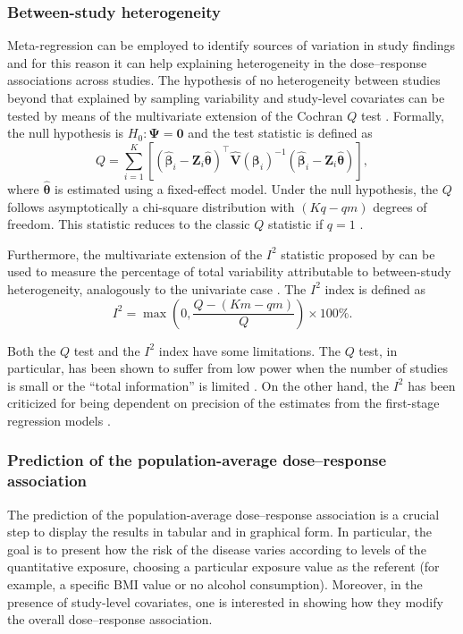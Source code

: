 \subsubsection{Between-study heterogeneity}
Meta-regression can be employed to identify sources of variation in study findings and for this reason it can help explaining heterogeneity in the dose--response associations across studies. The hypothesis of no heterogeneity between studies beyond that explained by sampling variability and study-level covariates can be tested by means of the multivariate extension of the Cochran $Q$ test \citep{ritz_multivariate_2008, jackson_quantifying_2012}. Formally, the null hypothesis is $H_0: \boldsymbol{\Psi} = \mathbf{0}$ and the test statistic is defined as
\begin{equation}
	Q= \sum_{i=1}^K \left[\left(\hat{\boldsymbol{\beta}}_i - \mathbf{Z}_i \hat{\boldsymbol{\theta}} \right)^\top  \hat{\mathbf{V}}(\boldsymbol{\beta}_i)^{-1} \left(\hat{\boldsymbol{\beta}}_i - \mathbf{Z}_i \hat{\boldsymbol{\theta}} \right) \right],
	\label{eq:multiq}
\end{equation}
where $\hat{\boldsymbol{\theta}}$ is estimated using a fixed-effect model. Under the null hypothesis, the $Q$ follows asymptotically a chi-square distribution with $(Kq-qm)$ degrees of freedom. This statistic reduces to the classic $Q$ statistic if $q=1$ \citep{cochran_combination_1954}.

Furthermore, the multivariate extension of the $I^2$ statistic proposed by \citet{jackson_quantifying_2012} can be used to measure the percentage of total variability attributable to between-study heterogeneity, analogously to the univariate case \citep{higgins_quantifying_2002}. The $I^2$ index is defined as
\begin{equation}
I^2 = \max\left(0, \frac{Q - (Km - qm)}{Q}\right)\times 100\%.
\label{eq:multii2}
\end{equation}


Both the $Q$ test and the $I^2$ index have some limitations. The $Q$ test, in particular, has been shown to suffer from low power when the number of studies is small or the ``total information'' is limited \citep{hardy_detecting_1998}. On the other hand, the $I^2$ has been criticized for being dependent on precision of the estimates from the first-stage regression models \citep{rucker_undue_2008}.

\subsubsection{Prediction of the population-average dose--response association}
The prediction of the population-average dose--response association is a crucial step to display the results in tabular and in graphical form. In particular, the goal is to present how the risk of the disease varies according to levels of the quantitative exposure, choosing a particular exposure value as the referent (for example, a specific BMI value or no alcohol consumption). Moreover, in the presence of study-level covariates, one is interested in showing how they modify the overall dose--response association.

